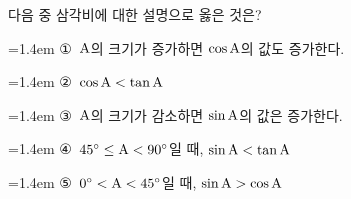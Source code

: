 다음 중 삼각비에 대한 설명으로 옳은 것은? 
\par\medskip\par\noindent\hangindent=1.4em {\small ①}\ $\mathrm{A}$의 크기가 증가하면 $\cos\mathrm{A}$의 값도 증가한다.\par\noindent\hangindent=1.4em {\small ②}\ $\cos\mathrm{A}<\tan\mathrm{A}$\par\noindent\hangindent=1.4em {\small ③}\ $\mathrm{A}$의 크기가 감소하면 $\sin\mathrm{A}$의 값은 증가한다.\par\noindent\hangindent=1.4em {\small ④}\ $45^\circ\le\mathrm{A}<90^\circ$일 때, $\sin\mathrm{A}<\tan\mathrm{A}$\par\noindent\hangindent=1.4em {\small ⑤}\ $0^\circ<\mathrm{A}<45^\circ$일 때, $\sin\mathrm{A}>\cos\mathrm{A}$\par\medskip
